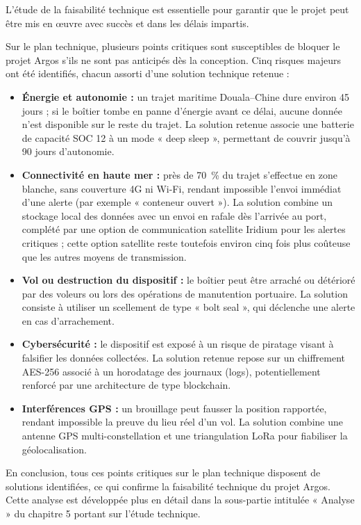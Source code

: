 L'étude de la faisabilité technique est essentielle pour garantir que le projet peut être mis en œuvre avec succès et dans les délais impartis.

Sur le plan technique, plusieurs points critiques sont susceptibles de bloquer le projet Argos s'ils ne sont pas anticipés dès la conception. Cinq risques majeurs ont été identifiés, chacun assorti d'une solution technique retenue :

\begin{itemize}
    \item \textbf{Énergie et autonomie :} un trajet maritime Douala--Chine dure environ 45 jours ; si le boîtier tombe en panne d'énergie avant ce délai, aucune donnée n'est disponible sur le reste du trajet. La solution retenue associe une batterie de capacité SOC 12 à un mode « deep sleep », permettant de couvrir jusqu'à 90 jours d'autonomie.
    \item \textbf{Connectivité en haute mer :} près de 70~\% du trajet s'effectue en zone blanche, sans couverture 4G ni Wi-Fi, rendant impossible l'envoi immédiat d'une alerte (par exemple « conteneur ouvert »). La solution combine un stockage local des données avec un envoi en rafale dès l'arrivée au port, complété par une option de communication satellite Iridium pour les alertes critiques ; cette option satellite reste toutefois environ cinq fois plus coûteuse que les autres moyens de transmission.
    \item \textbf{Vol ou destruction du dispositif :} le boîtier peut être arraché ou détérioré par des voleurs ou lors des opérations de manutention portuaire. La solution consiste à utiliser un scellement de type « bolt seal », qui déclenche une alerte en cas d'arrachement.
    \item \textbf{Cybersécurité :} le dispositif est exposé à un risque de piratage visant à falsifier les données collectées. La solution retenue repose sur un chiffrement AES-256 associé à un horodatage des journaux (logs), potentiellement renforcé par une architecture de type blockchain\cite{loi2010_cyber}.
    \item \textbf{Interférences GPS :} un brouillage peut fausser la position rapportée, rendant impossible la preuve du lieu réel d'un vol. La solution combine une antenne GPS multi-constellation et une triangulation LoRa pour fiabiliser la géolocalisation.
\end{itemize}

En conclusion, tous ces points critiques sur le plan technique disposent de solutions identifiées, ce qui confirme la faisabilité technique du projet Argos. Cette analyse est développée plus en détail dans la sous-partie intitulée « Analyse » du chapitre 5 portant sur l'étude technique.


